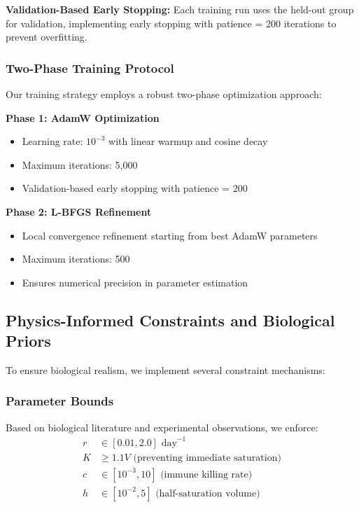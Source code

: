\documentclass{juliacon}
\begin{document}
\textbf{Validation-Based Early Stopping:} Each training run uses the held-out group for validation, implementing early stopping with patience = 200 iterations to prevent overfitting.

\subsubsection{Two-Phase Training Protocol}

Our training strategy employs a robust two-phase optimization approach:

\textbf{Phase 1: AdamW Optimization}
\begin{itemize}
    \item Learning rate: $10^{-3}$ with linear warmup and cosine decay
    \item Maximum iterations: 5,000
    \item Validation-based early stopping with patience = 200
\end{itemize}

\textbf{Phase 2: L-BFGS Refinement}
\begin{itemize}
    \item Local convergence refinement starting from best AdamW parameters
    \item Maximum iterations: 500
    \item Ensures numerical precision in parameter estimation
\end{itemize}

\subsection{Physics-Informed Constraints and Biological Priors}

To ensure biological realism, we implement several constraint mechanisms:

\subsubsection{Parameter Bounds}
Based on biological literature and experimental observations, we enforce:
\begin{align}
r &\in [0.01, 2.0] \text{ day}^{-1} \\
K &\geq 1.1V \text{ (preventing immediate saturation)} \\
c &\in [10^{-3}, 10] \text{ (immune killing rate)} \\
h &\in [10^{-2}, 5] \text{ (half-saturation volume)}
\end{align}
\end{document}
